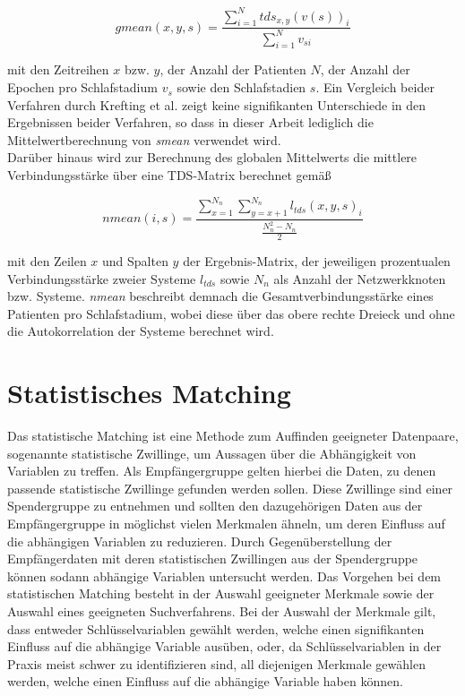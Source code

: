 \begin{equation}
gmean(x,y,s) = \frac{\sum \limits_{i=1}^N tds_{x,y}(v(s))_i}{\sum \limits_{i=1}^N v_{si}}
	\label{eq:gmean}
\end{equation}

mit den Zeitreihen $x$ bzw. $y$, der Anzahl der Patienten $N$, der Anzahl der Epochen pro Schlafstadium $v_s$ sowie den Schlafstadien $s$. Ein Vergleich beider Verfahren durch Krefting et al. zeigt keine signifikanten Unterschiede in den Ergebnissen beider Verfahren, so dass in dieser Arbeit lediglich die Mittelwertberechnung von \textit{smean} verwendet wird. \parencite{bashan_network_2012, krefting_age_2017}\\

Darüber hinaus wird zur Berechnung des globalen Mittelwerts die mittlere Verbindungsstärke über eine \acs{TDS}-Matrix berechnet gemäß

\begin{equation}
nmean(i,s) = \frac{\sum \limits_{x=1}^{N_n} \sum \limits_{y=x+1}^{N_n} l_{tds}(x,y,s)_i }{\frac{N_{n}^2 - N_n}{2}}
	\label{eq:nmean}
\end{equation}

mit den Zeilen $x$ und Spalten $y$ der Ergebnis-Matrix, der jeweiligen prozentualen Verbindungsstärke zweier Systeme $l_{tds}$ sowie $N_n$ als Anzahl der Netzwerkknoten bzw. Systeme. \textit{nmean} beschreibt demnach die Gesamtverbindungsstärke eines Patienten pro Schlafstadium, wobei diese über das obere rechte Dreieck und ohne die Autokorrelation der Systeme berechnet wird. \parencite{krefting_age_2017}

\section{Statistisches Matching}

Das statistische Matching ist eine Methode zum Auffinden geeigneter Datenpaare, sogenannte statistische Zwillinge, um Aussagen über die Abhängigkeit von Variablen zu treffen. Als Empfängergruppe gelten hierbei die Daten, zu denen passende statistische Zwillinge gefunden werden sollen. Diese Zwillinge sind einer Spendergruppe zu entnehmen und sollten den dazugehörigen Daten aus der Empfängergruppe in möglichst vielen Merkmalen ähneln, um deren Einfluss auf die abhängigen Variablen zu reduzieren. Durch Gegenüberstellung der Empfängerdaten mit deren statistischen Zwillingen aus der Spendergruppe können sodann abhängige Variablen untersucht werden. Das Vorgehen bei dem statistischen Matching besteht in der Auswahl geeigneter Merkmale sowie der Auswahl eines geeigneten Suchverfahrens. Bei der Auswahl der Merkmale gilt, dass entweder Schlüsselvariablen gewählt werden, welche einen signifikanten Einfluss auf die abhängige Variable ausüben, oder, da Schlüsselvariablen in der Praxis meist schwer zu identifizieren sind, all diejenigen Merkmale gewählen werden, welche einen Einfluss auf die abhängige Variable haben können. \parencite{weis_basiswissen_2005, bacher_statistisches_2002}\\

